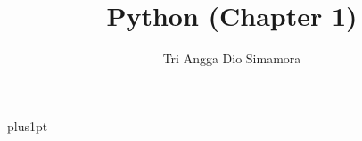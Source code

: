 \documentclass[12pt]{ociamthesis}  %
\title{Python (Chapter 1)}   %
\author{Tri Angga Dio Simamora}             %
\begin{document}
\baselineskip=18pt plus1pt

\setcounter{secnumdepth}{3}
\setcounter{tocdepth}{3}


\maketitle                  %

\begin{romanpages}          %
\tableofcontents            %
\listoffigures              %
\listoftables				%
\end{romanpages}            %






\end{document}
